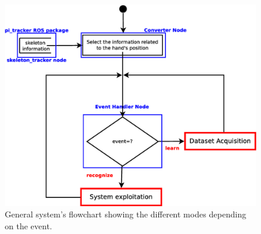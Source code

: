 \begin{figure}[H]
	\begin{center}
\includegraphics[width=0.8\linewidth]{img/diagrams/flowchart1.eps}
	\caption[General system's flowchart]{General system's flowchart showing the different modes depending on the event.}
	\label{flowchart1}
	\end{center}
\end{figure}




